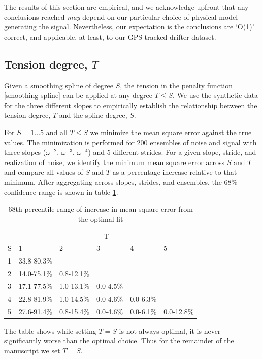 \documentclass{ametsoc}
\begin{document}
The results of this section are empirical, and we acknowledge upfront that any conclusions reached \emph{may} depend on our particular choice of physical model generating the signal. Nevertheless, our expectation is the conclusions are `O(1)' correct, and applicable, at least, to our GPS-tracked drifter dataset.

\subsection{Tension degree, $T$}
\label{subsec:tension_degree}

Given a smoothing spline of degree $S$, the tension in the penalty function \eqref{smoothing-spline} can be applied at any degree $T\leq S$. We use the synthetic data for the three different slopes to empirically establish the relationship between the tension degree, $T$ and the spline degree, $S$. 

For $S=1\dots 5$ and all $T\leq S$ we minimize the mean square error against the true values. 
The minimization is performed for 200 ensembles of noise and signal with three slopes ($\omega^{-2}$, $\omega^{-3}$, $\omega^{-4}$) and 5 different strides. For a given slope, stride, and realization of noise, we identify the minimum mean square error across $S$ and $T$ and compare all values of $S$ and $T$ as a percentage increase relative to that minimum. After aggregating across slopes, strides, and ensembles, the 68\% confidence range is shown in table \ref{optimal_T}.
\begin{table}[ht]
\caption{68th percentile range of increase in mean square error from the optimal fit}
\label{optimal_T}
\centering
\begin{tabular}{l *{5}{l}}
\toprule & \multicolumn{5}{c}{T} \\ 
\cmidrule(lr){2-6} 
S & 1 & 2 & 3 & 4 & 5 \\ \midrule 
1 & 33.8-80.3\% & & & & \\ 
2 & 14.0-75.1\% & 0.8-12.1\% & & & \\ 
3 & 17.1-77.5\% & 1.0-13.1\% & 0.0-4.5\% & & \\ 
4 & 22.8-81.9\% & 1.0-14.5\% & 0.0-4.6\% & 0.0-6.3\% & \\ 
5 & 27.6-91.4\% & 0.8-15.4\% & 0.0-4.6\% & 0.0-6.1\% & 0.0-12.8\% \\ 
 \bottomrule 
\end{tabular} 
\end{table}
The table shows while setting $T=S$ is not always optimal, it is never significantly worse than the optimal choice. Thus for the remainder of the manuscript we set $T=S$.
\end{document}
